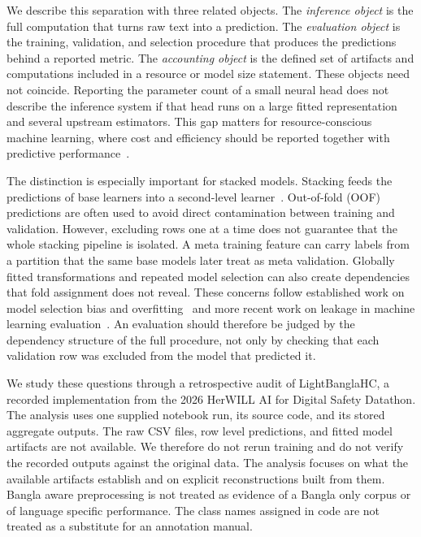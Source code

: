 \documentclass[runningheads]{llncs}
\begin{document}
We describe this separation with three related objects. The \emph{inference object} is the full computation that turns raw text into a prediction. The \emph{evaluation object} is the training, validation, and selection procedure that produces the predictions behind a reported metric. The \emph{accounting object} is the defined set of artifacts and computations included in a resource or model size statement. These objects need not coincide. Reporting the parameter count of a small neural head does not describe the inference system if that head runs on a large fitted representation and several upstream estimators. This gap matters for resource-conscious machine learning, where cost and efficiency should be reported together with predictive performance~\cite{schwartz2020greenai}.

The distinction is especially important for stacked models. Stacking feeds the predictions of base learners into a second-level learner~\cite{wolpert1992stacked}. Out-of-fold (OOF) predictions are often used to avoid direct contamination between training and validation. However, excluding rows one at a time does not guarantee that the whole stacking pipeline is isolated. A meta training feature can carry labels from a partition that the same base models later treat as meta validation. Globally fitted transformations and repeated model selection can also create dependencies that fold assignment does not reveal. These concerns follow established work on model selection bias and overfitting~\cite{varma2006bias,cawley2010overfitting} and more recent work on leakage in machine learning evaluation~\cite{kapoor2023leakage}. An evaluation should therefore be judged by the dependency structure of the full procedure, not only by checking that each validation row was excluded from the model that predicted it.

We study these questions through a retrospective audit of LightBanglaHC, a recorded implementation from the 2026 HerWILL AI for Digital Safety Datathon. The analysis uses one supplied notebook run, its source code, and its stored aggregate outputs. The raw CSV files, row level predictions, and fitted model artifacts are not available. We therefore do not rerun training and do not verify the recorded outputs against the original data. The analysis focuses on what the available artifacts establish and on explicit reconstructions built from them. Bangla aware preprocessing is not treated as evidence of a Bangla only corpus or of language specific performance. The class names assigned in code are not treated as a substitute for an annotation manual.
\end{document}
